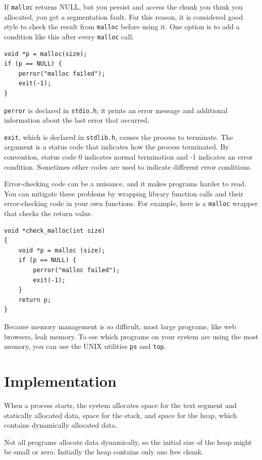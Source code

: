 \documentclass[12pt]{book}
\begin{document}
If {\tt malloc} returns NULL, but you persist and access
the chunk you think you allocated, you get a segmentation fault.
For this reason, it is considered good style to check the result from
{\tt malloc} before using it.  One option is to add a condition like
this after every {\tt malloc} call:

\begin{verbatim}
void *p = malloc(size);
if (p == NULL) {
    perror("malloc failed");
    exit(-1);
}
\end{verbatim}

{\tt perror} is declared in {\tt stdio.h}; it prints
an error message and additional information about the last error
that occurred.

{\tt exit}, which is declared in {\tt stdlib.h}, causes the process
to terminate.  The argument is a status code that indicates how
the process terminated.  By convention, status code 0 indicates normal
termination and -1 indicates an error condition.  Sometimes other
codes are used to indicate different error conditions.

Error-checking code can be a nuisance, and it makes programs
harder to read.  You can mitigate these problems by wrapping library
function calls and their error-checking code in your own
functions.  For example, here is a {\tt malloc} wrapper that checks
the return value.

\begin{verbatim}
void *check_malloc(int size)
{
    void *p = malloc (size);
    if (p == NULL) {
        perror("malloc failed");
        exit(-1);
    }
    return p;
}
\end{verbatim}

Because memory management is so difficult, most large programs, like
web browsers, leak memory.  To see which programs on your system are
using the most memory, you can use the UNIX utilities {\tt ps} and
{\tt top}.




\section{Implementation}

When a process starts, the system allocates space for the text segment
and statically allocated data, space for the stack, and space for the
heap, which contains dynamically allocated data.

Not all programs allocate data dynamically, so the initial size of the
heap might be small or zero.  Initially the heap contains only one
free chunk.
\end{document}
